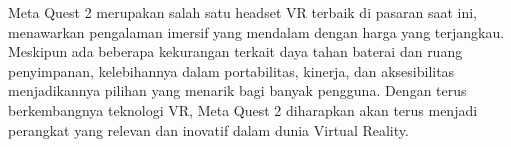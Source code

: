 Meta Quest 2 merupakan salah satu headset VR terbaik di pasaran saat ini, menawarkan pengalaman imersif yang mendalam dengan harga yang terjangkau. Meskipun ada beberapa kekurangan terkait daya tahan baterai dan ruang penyimpanan, kelebihannya dalam portabilitas, kinerja, dan aksesibilitas menjadikannya pilihan yang menarik bagi banyak pengguna. Dengan terus berkembangnya teknologi VR, Meta Quest 2 diharapkan akan terus menjadi perangkat yang relevan dan inovatif dalam dunia Virtual Reality.


